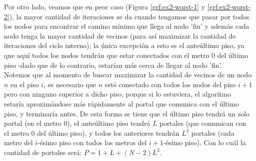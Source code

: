 \documentclass{article}
\theoremstyle{definition}
\theoremstyle{remark}
\begin{document}
Por otro lado, veamos que en peor caso (Figura \ref{grf:ex2-worst-1} y \ref{grf:ex2-worst-2}), la mayor cantidad de iteraciones se da cuando tengamos que pasar por todos los nodos para encontrar el camino mínimo que llega al nodo 'fin' y además cada nodo tenga la mayor cantidad de vecinos (para así maximizar la cantidad de iteraciones del ciclo interno); la única excepción a esto es el anteúltimo piso, ya que aquí todos los nodos tendrán que estar conectados con el metro 0 del último piso -dado que de lo contrario, estarían más cerca de llegar al nodo 'fin'.\\

Notemos que al momento de buscar maximizar la cantidad de vecinos de un nodo $n$ en el piso $i$, es necesario que $n$ esté conectado con todos los nodos del piso $i+1$ pero con ninguno superior a dicho piso, porque si lo estuviera, el algoritmo estaría aproximándose más rápidamente al portal que comunica con el último piso, y terminaría antes. De esta forma se tiene que el último piso tendrá un solo portal (en el metro 0), el anteúltimo piso tendrá $L$ portales (que comunican con el metro 0 del último piso), y todos los anteriores tendrán $L^2$ portales (cada metro del $i$-ésimo piso con todos los metros del $i+1$-ésimo piso). Con lo cuál la cantidad de portales será: $P = 1+L+(N-2)L^2$. \\
\end{document}
